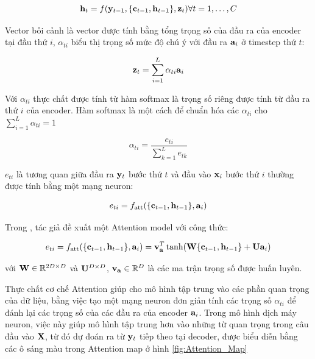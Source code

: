 \documentclass[14pt, a4paper]{article}
\numberwithin{equation}{section}
\numberwithin{algorithm}{section}
\numberwithin{figure}{section}
\numberwithin{table}{section}
\numberwithin{dl}{section}
\numberwithin{md}{section}
\numberwithin{bd}{section}
\numberwithin{dn}{section}
\numberwithin{hq}{section}
\begin{document}
    \begin{equation}
        \bold{h}_t = f(\bold{y}_{t-1}, \lbrace \bold{c}_{t-1}, \bold{h}_{t-1} \rbrace, \bold{z}_t) \forall t=1,\dots,C
    \end{equation}

    Vector bối cảnh là vector được tính bằng tổng trọng số của đầu ra của encoder tại đầu thứ $i$, $\alpha_{ti}$ biểu thị trọng số mức độ chú ý với đầu ra $\bold{a}_i$ ở timestep thứ $t$:

    \begin{equation}
        \bold{z}_t = \sum_{i=1}^{L}\alpha_{ti}\bold{a}_i
    \end{equation}

    Với $\alpha_{ti}$ thực chất được tính từ hàm softmax là trọng số riêng được tính từ đầu ra thứ $i$ của encoder. Hàm softmax là một cách để chuẩn hóa các $\alpha_{ti}$ cho $\sum_{i=1}^{L}\alpha_{ti}=1$

    \begin{equation}
        \alpha_{ti} = \dfrac{e_{ti}}{\sum_{k=1}^{L} e_{tk}}
    \end{equation}

    $e_{ti}$ là tương quan giữa đầu ra $\bold{y}_t$ bước thứ $t$ và đầu vào $\bold{x}_i$ bước thứ $i$ thường được tính bằng một mạng neuron:

    \begin{equation}
        e_{ti} = f_{\text{att}}(\lbrace \bold{c}_{t-1}, \bold{h}_{t-1} \rbrace, \bold{a}_i)
    \end{equation}

    Trong \cite{bahdanau2014neural}, tác giả đề xuất một Attention model với công thức:

    \begin{equation}
        e_{ti} = f_{\text{att}}(\lbrace \bold{c}_{t-1}, \bold{h}_{t-1} \rbrace, \bold{a}_i) = \bold{v}_{\bold{a}}^T \tanh (\bold{W} \lbrace \bold{c}_{t-1}, \bold{h}_{t-1} \rbrace + \bold{U}\bold{a}_i)
    \end{equation}

    với $\bold{W} \in \mathbb{R}^{2D \times D}$ và $\bold{U}^{D \times D}$, $\bold{v}_{\bold{a}} \in \mathbb{R}^{D}$ là các ma trận trọng số được huấn luyên.

    Thực chất cơ chế Attention giúp cho mô hình tập trung vào các phần quan trọng của dữ liệu, bằng việc tạo một mạng neuron đơn giản tính các trọng số $\alpha_{ti}$ để đánh lại các trọng số của các đầu ra của encoder $\bold{a}_i$.
    Trong mô hình dịch máy neuron, việc này giúp mô hình tập trung hơn vào những từ quan trọng trong câu đầu vào $\bold{X}$, từ đó dự đoán ra từ $\bold{y}_t$ tiếp theo tại decoder, được biểu diễn bằng các ô sáng màu trong Attention map ở hình \ref{fig:Attention_Map}
\end{document}
